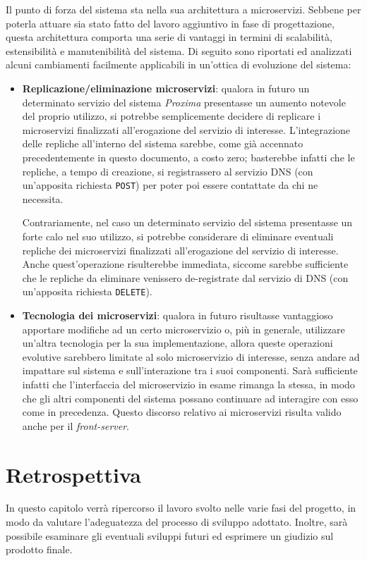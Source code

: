 \documentclass[a4paper,12pt]{report}
\begin{document}
Il punto di forza del sistema sta nella sua architettura a microservizi. Sebbene per poterla attuare sia stato fatto del lavoro aggiuntivo in fase di progettazione, questa architettura comporta una serie di vantaggi in termini di scalabilità, estensibilità e manutenibilità del sistema. Di seguito sono riportati ed analizzati alcuni cambiamenti facilmente applicabili in un'ottica di evoluzione del sistema:
\begin{itemize}
	\item \textbf{Replicazione/eliminazione microservizi}: qualora in futuro un determinato servizio del sistema \emph{Proxima} presentasse un aumento notevole del proprio utilizzo, si potrebbe semplicemente decidere di replicare i microservizi finalizzati all'erogazione del servizio di interesse. L'integrazione delle repliche all'interno del sistema sarebbe, come già accennato precedentemente in questo documento, a costo zero; basterebbe infatti che le repliche, a tempo di creazione, si registrassero al servizio DNS (con un'apposita richiesta \texttt{POST}) per poter poi essere contattate da chi ne necessita.
	
	Contrariamente, nel caso un determinato servizio del sistema presentasse un forte calo nel suo utilizzo, si potrebbe considerare di eliminare eventuali repliche dei microservizi finalizzati all'erogazione del servizio di interesse. Anche quest'operazione risulterebbe immediata, siccome sarebbe sufficiente che le repliche da eliminare venissero de-registrate dal servizio di DNS (con un'apposita richiesta \texttt{DELETE}).
	
	\item \textbf{Tecnologia dei microservizi}: qualora in futuro risultasse vantaggioso apportare modifiche ad un certo microservizio o, più in generale, utilizzare un'altra tecnologia per la sua implementazione, allora queste operazioni evolutive sarebbero limitate al solo microservizio di interesse, senza andare ad impattare sul sistema e sull'interazione tra i suoi componenti. Sarà sufficiente infatti che l'interfaccia del microservizio in esame rimanga la stessa, in modo che gli altri componenti del sistema possano continuare ad interagire con esso come in precedenza. Questo discorso relativo ai microservizi risulta valido anche per il \emph{front-server}.
\end{itemize}


\chapter{Retrospettiva}
In questo capitolo verrà ripercorso il lavoro svolto nelle varie fasi del progetto, in modo da valutare l'adeguatezza del processo di sviluppo adottato. Inoltre, sarà possibile esaminare gli eventuali sviluppi futuri ed esprimere un giudizio sul prodotto finale.
\end{document}
